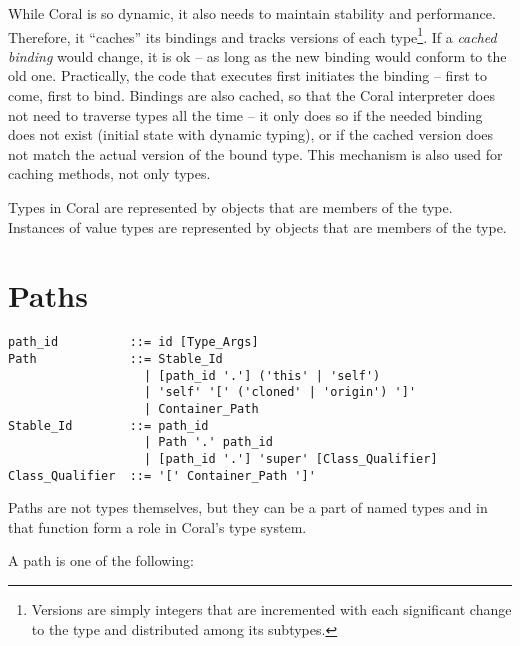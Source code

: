 While Coral is so dynamic, it also needs to maintain stability and performance. Therefore, it ``caches'' its bindings and tracks versions of each type\footnote{Versions are simply integers that are incremented with each significant change to the type and distributed among its subtypes.}. If a {\em cached binding} would change, it is ok -- as long as the new binding would conform to the old one. Practically, the code that executes first initiates the binding -- first to come, first to bind. Bindings are also cached, so that the Coral interpreter does not need to traverse types all the time -- it only does so if the needed binding does not exist (initial state with dynamic typing), or if the cached version does not match the actual version of the bound type. This mechanism is also used for caching methods, not only types.

Types in Coral are represented by objects that are members of the  type. Instances of value types are represented by objects that are members of the  type. 






\section{Paths}
\label{sec:type-paths}

\syntax\begin{lstlisting}
path_id          ::= id [Type_Args]
Path             ::= Stable_Id
                   | [path_id '.'] ('this' | 'self')
                   | 'self' '[' ('cloned' | 'origin') ']'
                   | Container_Path
Stable_Id        ::= path_id
                   | Path '.' path_id
                   | [path_id '.'] 'super' [Class_Qualifier]
Class_Qualifier  ::= '[' Container_Path ']'
\end{lstlisting}

Paths are not types themselves, but they can be a part of named types and in that function form a role in Coral's type system. 

A path is one of the following:

